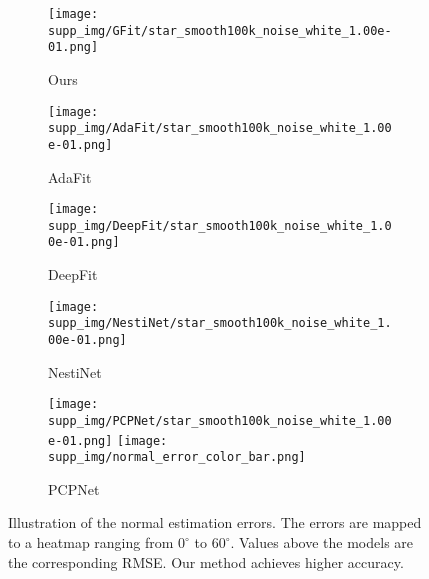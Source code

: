 \documentclass[runningheads]{llncs}
\begin{document}
\begin{figure*}
\begin{subfigure}{0.15\linewidth}
		\centering
		\texttt{[image: supp\_img/GFit/star\_smooth100k\_noise\_white\_1.00e-01.png]}
		\caption{Ours}
	\end{subfigure}
	\hspace{0.1cm}
	\begin{subfigure}{0.15\linewidth}
		\centering
		\texttt{[image: supp\_img/AdaFit/star\_smooth100k\_noise\_white\_1.00e-01.png]}
		\caption{AdaFit}
	\end{subfigure}
	\hspace{0.1cm}
	\begin{subfigure}{0.17\linewidth}
		\centering
		\texttt{[image: supp\_img/DeepFit/star\_smooth100k\_noise\_white\_1.00e-01.png]}
		\caption{DeepFit}
	\end{subfigure}
	\hspace{0.1cm}
	\begin{subfigure}{0.17\linewidth}
		\centering
		\texttt{[image: supp\_img/NestiNet/star\_smooth100k\_noise\_white\_1.00e-01.png]}
		\caption{NestiNet}
	\end{subfigure}
	\hspace{0.1cm}
	\begin{subfigure}{0.17\linewidth}
		\centering
		\texttt{[image: supp\_img/PCPNet/star\_smooth100k\_noise\_white\_1.00e-01.png]}
		\hspace{0.3cm}
		\texttt{[image: supp\_img/normal\_error\_color\_bar.png]}
		\caption{PCPNet}
	\end{subfigure}
\caption{Illustration of the normal estimation errors.
		The errors are mapped to a heatmap ranging from $0^\circ$ to $60^\circ$. Values above the models are the corresponding RMSE. Our method achieves higher accuracy.
	}
	\label{fig:quali3}
\end{figure*}
\end{document}
